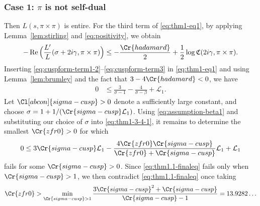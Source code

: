 \documentclass[12pt,reqno]{amsart}
\theoremstyle{remark}
\DeclareMathOperator{\Real}{Re}
\newcommand{\Q}{\mathbb{Q}}
\numberwithin{equation}{section}
\begin{document}
	\subsubsection{Case 1: \texorpdfstring{$\pi$}{pi} is not self-dual}\label{subsubsec:case1-thm1}
	Then 
	$L(s, \pi \times \pi)$ is entire. For the third term of \eqref{eq:thm1-eq1}, by applying Lemma~\ref{lem:stirling} and \eqref{eq:positivity}, we  obtain
	\begin{equation}
		\label{eq:cuspform-term3}
		-\Real\Big(\frac{L'}{L}(\sigma+2i\gamma, \pi \times \pi)\Big) \le -\frac{\Cr{hadamard}}{2} + \frac{1}{2}\log \mathfrak{C}(2i\gamma, \pi \times \pi).
	\end{equation}
	Inserting \eqref{eq:cuspform-term1-2}--\eqref{eq:cuspform-term3} in \eqref{eq:thm1-eq1} and using Lemma~\ref{lem:brumley} and the fact that $3-4\Cr{hadamard} < 0$, we have 
	\begin{equation}\label{eq:thm1-3-4-1}
		\begin{aligned}
			0 
			&\le \frac{3}{\sigma-1}- \frac{4}{\sigma-\beta} + \mathcal{L}_1.%
		\end{aligned}
	\end{equation}
	Let $\Cl[abcon]{sigma-cusp} > 0$ denote a sufficiently large constant, and choose $\sigma = 1 + {1}/({\Cr{sigma-cusp}\mathcal{L}_1})$. %
	Using \eqref{eq:assumption-beta1} and substituting our choice of $\sigma$ into \eqref{eq:thm1-3-4-1}, it remains to determine the smallest $\Cr{zfr0} > 0$ for which 
	\begin{equation}\label{eq:thm1.1-finaleq}
		0 \le 3\Cr{sigma-cusp}\mathcal{L}_1-\frac{4\Cr{zfr0}\Cr{sigma-cusp}}{\Cr{zfr0}+\Cr{sigma-cusp}}\mathcal{L}_1+\mathcal{L}_1
	\end{equation}
	fails for some $\Cr{sigma-cusp} > 0$. Since \eqref{eq:thm1.1-finaleq} fails only when $\Cr{sigma-cusp} >1$, we then contradict \eqref{eq:thm1.1-finaleq} once  taking
	\[
	\Cr{zfr0} >  \min_{\Cr{sigma-cusp} > 1} \frac{3\Cr{sigma-cusp}^2+\Cr{sigma-cusp}}{\Cr{sigma-cusp}-1} =  13.9282\ldots
	\]
	
\end{document}

